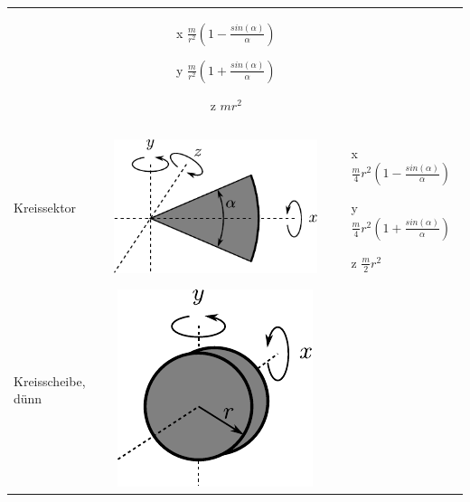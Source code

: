 \begin{table}[h!]
\begin{tabular}{m{2cm} c m{}}
\begin{minipage}{0.3\textwidth}
	\end{minipage} &
		\begin{itemize}
		\item[x] $\frac{m}{r^2} 
			\left(1-\frac{sin(\alpha)}{\alpha} \right)$
		\item[y]  $\frac{m}{r^2} 
			\left(1+\frac{sin(\alpha)}{\alpha} \right)$
		\item[z] $mr^2$
		\end{itemize} \\
Kreissektor &
	\begin{minipage}{0.3\textwidth}
	\centering
	\includegraphics[scale=\traegscale]{traeg-kreissektor.pdf}
	\end{minipage} &
		\begin{itemize}
		\item[x] $\frac{m}{4} r^2  
			\left(1-\frac{sin(\alpha)}{\alpha} \right)$
		\item[y]  $\frac{m}{4} r^2 
			\left(1+\frac{sin(\alpha)}{\alpha} \right)$
		\item[z] $\frac{m}{2} r^2$	
		\end{itemize} \\
Kreisscheibe, dünn &
	\begin{minipage}{0.3\textwidth}
	\centering
	\includegraphics[scale=\traegscale]{traeg-kreisscheibe-duenn.pdf}
	\end{minipage} &
		\begin{itemize}

\end{itemize}
\end{tabular}
\end{table}
